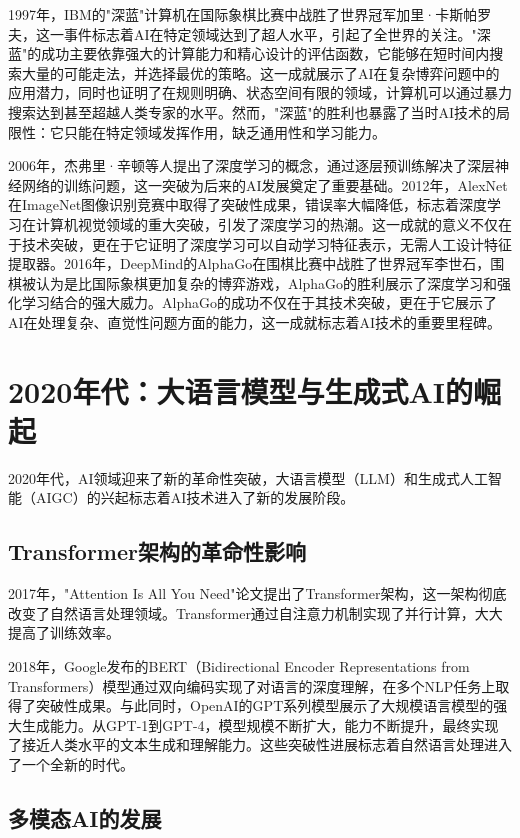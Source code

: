 1997年，IBM的"深蓝"计算机在国际象棋比赛中战胜了世界冠军加里·卡斯帕罗夫，这一事件标志着AI在特定领域达到了超人水平，引起了全世界的关注。"深蓝"的成功主要依靠强大的计算能力和精心设计的评估函数，它能够在短时间内搜索大量的可能走法，并选择最优的策略。这一成就展示了AI在复杂博弈问题中的应用潜力，同时也证明了在规则明确、状态空间有限的领域，计算机可以通过暴力搜索达到甚至超越人类专家的水平。然而，"深蓝"的胜利也暴露了当时AI技术的局限性：它只能在特定领域发挥作用，缺乏通用性和学习能力。

2006年，杰弗里·辛顿等人提出了深度学习的概念，通过逐层预训练解决了深层神经网络的训练问题，这一突破为后来的AI发展奠定了重要基础。2012年，AlexNet在ImageNet图像识别竞赛中取得了突破性成果，错误率大幅降低，标志着深度学习在计算机视觉领域的重大突破，引发了深度学习的热潮。这一成就的意义不仅在于技术突破，更在于它证明了深度学习可以自动学习特征表示，无需人工设计特征提取器。2016年，DeepMind的AlphaGo在围棋比赛中战胜了世界冠军李世石，围棋被认为是比国际象棋更加复杂的博弈游戏，AlphaGo的胜利展示了深度学习和强化学习结合的强大威力。AlphaGo的成功不仅在于其技术突破，更在于它展示了AI在处理复杂、直觉性问题方面的能力，这一成就标志着AI技术的重要里程碑。

\section{2020年代：大语言模型与生成式AI的崛起}

2020年代，AI领域迎来了新的革命性突破，大语言模型（LLM）和生成式人工智能（AIGC）的兴起标志着AI技术进入了新的发展阶段。

\subsection{Transformer架构的革命性影响}

2017年，"Attention Is All You Need"论文提出了Transformer架构，这一架构彻底改变了自然语言处理领域。Transformer通过自注意力机制实现了并行计算，大大提高了训练效率。

2018年，Google发布的BERT（Bidirectional Encoder Representations from Transformers）模型通过双向编码实现了对语言的深度理解，在多个NLP任务上取得了突破性成果。与此同时，OpenAI的GPT系列模型展示了大规模语言模型的强大生成能力。从GPT-1到GPT-4，模型规模不断扩大，能力不断提升，最终实现了接近人类水平的文本生成和理解能力。这些突破性进展标志着自然语言处理进入了一个全新的时代。

\subsection{多模态AI的发展}

